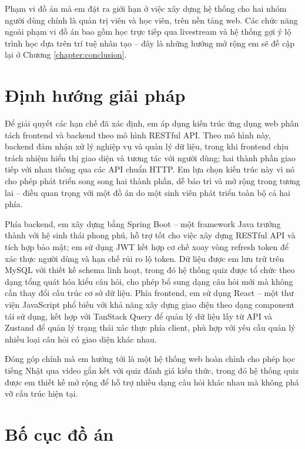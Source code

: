 \documentclass[../DoAn.tex]{subfiles}
\begin{document}
Phạm vi đồ án mà em đặt ra giới hạn ở việc xây dựng hệ thống cho hai nhóm người dùng chính là quản trị viên và học viên, trên nền tảng web. Các chức năng ngoài phạm vi đồ án bao gồm học trực tiếp qua livestream và hệ thống gợi ý lộ trình học dựa trên trí tuệ nhân tạo -- đây là những hướng mở rộng em sẽ đề cập lại ở Chương \ref{chapter:conclusion}.

\section{Định hướng giải pháp}
\label{section:1.3}

Để giải quyết các hạn chế đã xác định, em áp dụng kiến trúc ứng dụng web phân tách frontend và backend theo mô hình RESTful API. Theo mô hình này, backend đảm nhận xử lý nghiệp vụ và quản lý dữ liệu, trong khi frontend chịu trách nhiệm hiển thị giao diện và tương tác với người dùng; hai thành phần giao tiếp với nhau thông qua các API chuẩn HTTP. Em lựa chọn kiến trúc này vì nó cho phép phát triển song song hai thành phần, dễ bảo trì và mở rộng trong tương lai -- điều quan trọng với một đồ án do một sinh viên phát triển toàn bộ cả hai phía.

Phía backend, em xây dựng bằng Spring Boot -- một framework Java trưởng thành với hệ sinh thái phong phú, hỗ trợ tốt cho việc xây dựng RESTful API và tích hợp bảo mật; em sử dụng JWT kết hợp cơ chế xoay vòng refresh token để xác thực người dùng và hạn chế rủi ro lộ token. Dữ liệu được em lưu trữ trên MySQL với thiết kế schema linh hoạt, trong đó hệ thống quiz được tổ chức theo dạng tổng quát hóa kiểu câu hỏi, cho phép bổ sung dạng câu hỏi mới mà không cần thay đổi cấu trúc cơ sở dữ liệu. Phía frontend, em sử dụng React -- một thư viện JavaScript phổ biến với khả năng xây dựng giao diện theo dạng component tái sử dụng, kết hợp với TanStack Query để quản lý dữ liệu lấy từ API và Zustand để quản lý trạng thái xác thực phía client, phù hợp với yêu cầu quản lý nhiều loại câu hỏi có giao diện khác nhau.

Đóng góp chính mà em hướng tới là một hệ thống web hoàn chỉnh cho phép học tiếng Nhật qua video gắn kết với quiz đánh giá kiến thức, trong đó hệ thống quiz được em thiết kế mở rộng để hỗ trợ nhiều dạng câu hỏi khác nhau mà không phá vỡ cấu trúc hiện tại.

\section{Bố cục đồ án}
\label{section:1.4}
\end{document}
